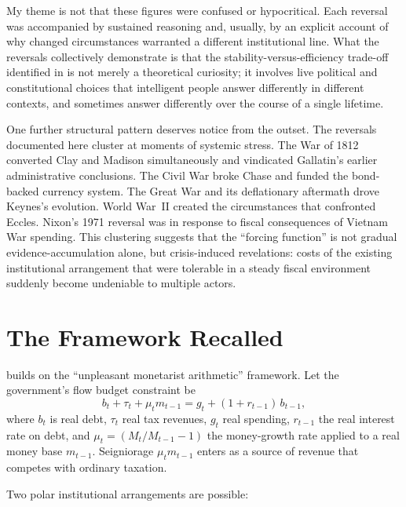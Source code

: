 \documentclass[12pt]{article}
\begin{document}
My theme is not that these figures were confused or hypocritical.
Each reversal was accompanied by sustained reasoning and, usually, by
an explicit account of why changed circumstances warranted a different
institutional line.  What the reversals collectively demonstrate is that
the stability-versus-efficiency trade-off identified in
\citet{Sargent2011} is not merely a theoretical curiosity; it involves
live political and constitutional choices that intelligent people answer
differently in different contexts, and sometimes answer differently over
the course of a single lifetime.

One further structural pattern deserves notice from the outset.  The
reversals documented here cluster at moments of systemic stress.  The
War of 1812 converted Clay and Madison simultaneously and vindicated
Gallatin's earlier administrative conclusions.  The Civil War broke
Chase and funded the bond-backed currency system.  The Great War and its
deflationary aftermath drove Keynes's evolution.  World War~II created
the circumstances that confronted  Eccles.  Nixon's 1971 reversal was in response to  fiscal consequences of Vietnam War spending.  This clustering
suggests that the ``forcing function'' is not gradual evidence-accumulation
alone, but crisis-induced revelations: costs of the existing
institutional arrangement that were tolerable in a steady fiscal
environment suddenly become undeniable to multiple actors.


\section{The Framework Recalled}

\citet{Sargent2011} builds on the \citet{SargentWallace1981}
``unpleasant monetarist arithmetic'' framework.  Let the government's
flow budget constraint be
\begin{equation}
\label{eq:flow}
b_t + \tau_t + \mu_t m_{t-1} = g_t + (1+r_{t-1})\,b_{t-1},
\end{equation}
where $b_t$ is real debt, $\tau_t$ real tax revenues, $g_t$ real spending,
$r_{t-1}$ the real interest rate on debt, and $\mu_t = (M_t/M_{t-1}-1)$
the money-growth rate applied to a real money base $m_{t-1}$.  Seigniorage
$\mu_t m_{t-1}$ enters as a source of revenue that competes with ordinary
taxation.

Two polar institutional arrangements are possible:
\end{document}
